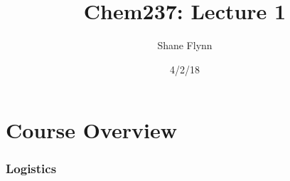 \documentclass{article}
\title{Chem237: Lecture 1}
\date{4/2/18}
\author{Shane Flynn}
\begin{document}
\maketitle

\section*{Course Overview}


\subsubsection*{Logistics}
\end{document}
